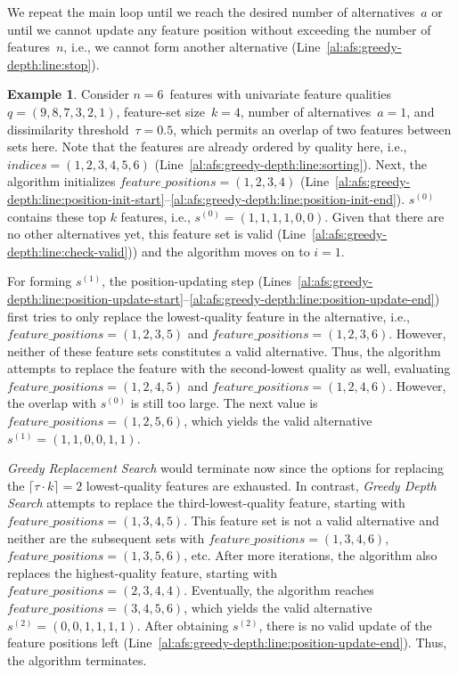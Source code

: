 \documentclass{article}
\theoremstyle{definition}
\newtheorem{example}{Example}
\begin{document}
We repeat the main loop until we reach the desired number of alternatives~$a$ or until we cannot update any feature position without exceeding the number of features~$n$, i.e., we cannot form another alternative (Line~\ref{al:afs:greedy-depth:line:stop}).
%
\begin{example}
Consider $n=6$~features with univariate feature qualities $q = (9,8,7,3,2,1)$, feature-set size~$k=4$, number of alternatives~$a=1$, and dissimilarity threshold~$\tau = 0.5$, which permits an overlap of two features between sets here.
Note that the features are already ordered by quality here, i.e., $indices = (1,2,3,4,5,6)$ (Line~\ref{al:afs:greedy-depth:line:sorting}).
Next, the algorithm initializes $feature\_positions = (1,2,3,4)$ (Line~\ref{al:afs:greedy-depth:line:position-init-start}--\ref{al:afs:greedy-depth:line:position-init-end}).
$s^{(0)}$ contains these top $k$ features, i.e., $s^{(0)} = (1,1,1,1,0,0)$.
Given that there are no other alternatives yet, this feature set is valid (Line~\ref{al:afs:greedy-depth:line:check-valid})) and the algorithm moves on to $i=1$.

For forming $s^{(1)}$, the position-updating step (Lines~\ref{al:afs:greedy-depth:line:position-update-start}--\ref{al:afs:greedy-depth:line:position-update-end}) first tries to only replace the lowest-quality feature in the alternative, i.e., $feature\_positions = (1,2,3,5)$ and $feature\_positions = (1,2,3,6)$.
However, neither of these feature sets constitutes a valid alternative.
Thus, the algorithm attempts to replace the feature with the second-lowest quality as well, evaluating $feature\_positions = (1,2,4,5)$ and $feature\_positions = (1,2,4,6)$.
However, the overlap with $s^{(0)}$ is still too large.
The next value is $feature\_positions = (1,2,5,6)$, which yields the valid alternative $s^{(1)} = (1,1,0,0,1,1)$.

\emph{Greedy Replacement Search} would terminate now since the options for replacing the $\lceil \tau \cdot k \rceil = 2$ lowest-quality features are exhausted.
In contrast, \emph{Greedy Depth Search} attempts to replace the third-lowest-quality feature, starting with $feature\_positions = (1,3,4,5)$.
This feature set is not a valid alternative and neither are the subsequent sets with $feature\_positions = (1,3,4,6)$, $feature\_positions = (1,3,5,6)$, etc.
After more iterations, the algorithm also replaces the highest-quality feature, starting with $feature\_positions = (2,3,4,4)$.
Eventually, the algorithm reaches $feature\_positions = (3,4,5,6)$, which yields the valid alternative $s^{(2)} = (0,0,1,1,1,1)$.
After obtaining $s^{(2)}$, there is no valid update of the feature positions left (Line~\ref{al:afs:greedy-depth:line:position-update-end}).
Thus, the algorithm terminates.
\label{ex:afs:greedy-depth:algorithm}
\end{example}
\end{document}
